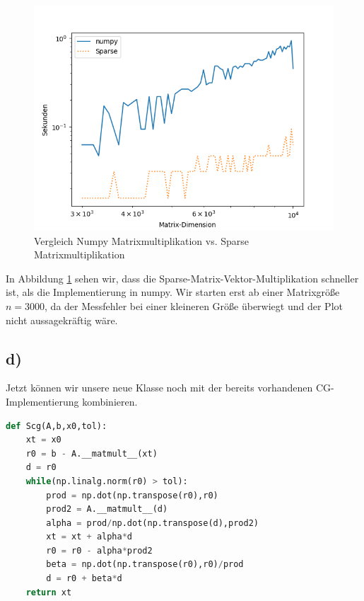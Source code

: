 \begin{figure}
    \centering
    \includegraphics[width=0.8\linewidth]{Aufgabe_1/matmult_plot.png}
    \caption{Vergleich Numpy Matrixmultiplikation vs. Sparse Matrixmultiplikation}
    \label{mul}
\end{figure}
\FloatBarrier

In Abbildung \ref{mul} sehen wir, dass die Sparse-Matrix-Vektor-Multiplikation schneller ist, als die Implementierung in numpy.
Wir starten erst ab einer Matrixgröße $n=3000$, da der Messfehler bei einer kleineren Größe überwiegt und der Plot nicht aussagekräftig wäre.


\subsection*{d)}
Jetzt können wir unsere neue Klasse noch mit der bereits vorhandenen CG-Implementierung kombinieren. \\
\begin{lstlisting}[language=Python]
def Scg(A,b,x0,tol):
    xt = x0
    r0 = b - A.__matmult__(xt)
    d = r0
    while(np.linalg.norm(r0) > tol):
        prod = np.dot(np.transpose(r0),r0)
        prod2 = A.__matmult__(d)
        alpha = prod/np.dot(np.transpose(d),prod2)
        xt = xt + alpha*d
        r0 = r0 - alpha*prod2
        beta = np.dot(np.transpose(r0),r0)/prod
        d = r0 + beta*d
    return xt
\end{lstlisting}

